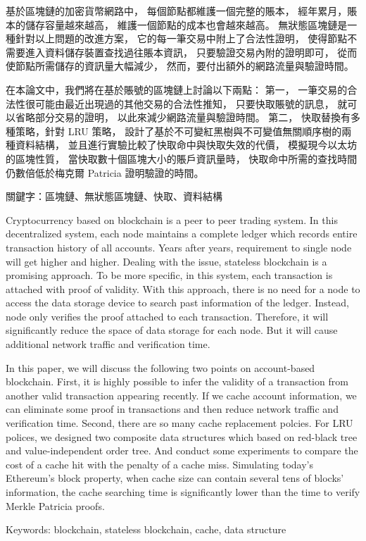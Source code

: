 \begin{abstractzh}
基於區塊鏈的加密貨幣網路中，
每個節點都維護一個完整的賬本，
經年累月，賬本的儲存容量越來越高，
維護一個節點的成本也會越來越高。
無狀態區塊鏈是一種針對以上問題的改進方案，
它的每一筆交易中附上了合法性證明，
使得節點不需要進入資料儲存裝置查找過往賬本資訊，
只要驗證交易內附的證明即可，
從而使節點所需儲存的資訊量大幅減少，
然而，要付出額外的網路流量與驗證時間。

在本論文中，我們將在基於賬號的區塊鏈上討論以下兩點：
第一，
一筆交易的合法性很可能由最近出現過的其他交易的合法性推知，
只要快取賬號的訊息，
就可以省略部分交易的證明，
以此來減少網路流量與驗證時間。
第二，
快取替換有多種策略，針對 LRU 策略，
設計了基於不可變紅黑樹與不可變值無關順序樹的兩種資料結構，
並且進行實驗比較了快取命中與快取失效的代價，
模擬現今以太坊的區塊性質，
當快取數十個區塊大小的賬戶資訊量時，
快取命中所需的查找時間仍數倍低於梅克爾 Patricia 證明驗證的時間。


\bigbreak
\noindent
關鍵字：區塊鏈、無狀態區塊鏈、快取、資料結構
\end{abstractzh}

\begin{abstracten}

Cryptocurrency based on blockchain is a peer to peer trading
system. In this decentralized system,
each node maintains a complete ledger which
records entire transaction history of all accounts.
Years after years, requirement to single node will
get higher and higher. Dealing with the issue, stateless
blockchain is a promising approach. To be more specific,
in this system, each transaction is attached with proof
of validity. With this approach, there is no need for a node
to access the data storage device to search past information
of the ledger. Instead, node only verifies the proof attached
to each transaction. Therefore, it will significantly
reduce the space of data storage for each node.
But it will cause additional network traffic and
verification time.

In this paper, we will discuss the following two points
on account-based blockchain.
First,
it is highly possible to infer the validity of
a transaction from another valid transaction appearing recently.
If we cache account information, we can eliminate some
proof in transactions and then reduce network traffic
and verification time.
Second,
there are so many cache replacement polcies.
For LRU polices, we designed two composite data
structures which based on red-black tree and value-independent order tree.
And conduct some experiments to compare the cost of a
cache hit with the penalty of a cache miss.
Simulating today's Ethereum's block property,
when cache size can contain several tens of blocks' information,
the cache searching time is significantly lower than
the time to verify Merkle Patricia proofs.

\bigbreak
\noindent
Keywords: blockchain, stateless blockchain, cache, data structure
\end{abstracten}

